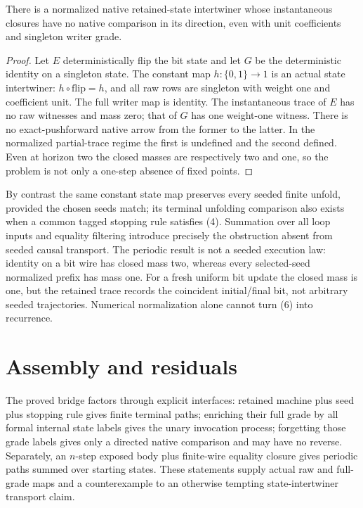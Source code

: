 \documentclass[11pt]{article}
\begin{document}
\begin{proposition}
There is a normalized native retained-state intertwiner whose instantaneous closures have no native comparison in its direction, even with unit coefficients and singleton writer grade.
\end{proposition}
\begin{proof}
Let $E$ deterministically flip the bit state and let $G$ be the deterministic identity on a singleton state. The constant map $h:\{0,1\}\to1$ is an actual state intertwiner: $h\circ\mathrm{flip}=h$, and all raw rows are singleton with weight one and coefficient unit. The full writer map is identity. The instantaneous trace of $E$ has no raw witnesses and mass zero; that of $G$ has one weight-one witness. There is no exact-pushforward native arrow from the former to the latter. In the normalized partial-trace regime the first is undefined and the second defined. Even at horizon two the closed masses are respectively two and one, so the problem is not only a one-step absence of fixed points.
\end{proof}

By contrast the same constant state map preserves every seeded finite unfold, provided the chosen seeds match; its terminal unfolding comparison also exists when a common tagged stopping rule satisfies (4). Summation over all loop inputs and equality filtering introduce precisely the obstruction absent from seeded causal transport. The periodic result is not a seeded execution law: identity on a bit wire has closed mass two, whereas every selected-seed normalized prefix has mass one. For a fresh uniform bit update the closed mass is one, but the retained trace records the coincident initial/final bit, not arbitrary seeded trajectories. Numerical normalization alone cannot turn (6) into recurrence.

\section{Assembly and residuals}
The proved bridge factors through explicit interfaces: retained machine plus seed plus stopping rule gives finite terminal paths; enriching their full grade by all formal internal state labels gives the unary invocation process; forgetting those grade labels gives only a directed native comparison and may have no reverse. Separately, an $n$-step exposed body plus finite-wire equality closure gives periodic paths summed over starting states. These statements supply actual raw and full-grade maps and a counterexample to an otherwise tempting state-intertwiner transport claim.
\end{document}
